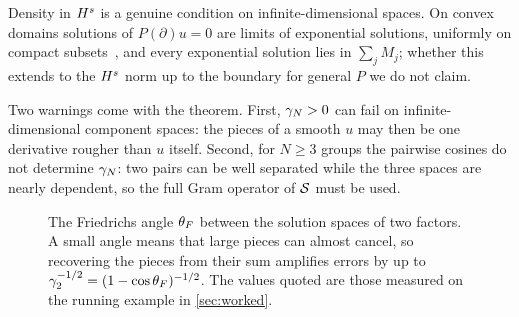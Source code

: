 Density in $H^{s}$ is a genuine condition on infinite-dimensional spaces. On convex domains solutions of
$P(\partial)u=0$ are limits of exponential solutions, uniformly on compact subsets~\cite{Mal56,Hor90},
and every exponential solution lies in $\sum_jM_j$; whether this extends to the $H^{s}$ norm up to the boundary
for general $P$ we do not claim.

Two warnings come with the theorem. First, $\gamma_{N}>0$ can fail on infinite-dimensional component spaces: the pieces of a smooth $u$ may then be
one derivative rougher than $u$ itself. Second, for $N\ge3$ groups the pairwise cosines do not
determine $\gamma_{N}$: two pairs can be well separated while the three spaces are nearly dependent, so the
full Gram operator of $\mathcal{S}$ must be used.

\begin{figure}[tbp]
\centering
{}
\caption{The Friedrichs angle $\theta_{F}$ between the solution spaces of two factors. A small angle
means that large pieces can almost cancel, so recovering the pieces from their sum amplifies errors by
up to $\gamma_2^{-1/2}=(1-\cos\theta_{F})^{-1/2}$. The values quoted are those measured on the running
example in \cref{sec:worked}.}\label{fig:friedrichs}
\end{figure}

